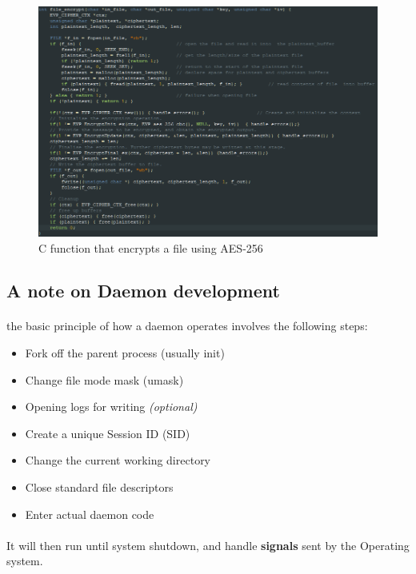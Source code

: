 \documentclass{article}
\begin{document}
        \begin{figure}[htbp]
            \centering\includegraphics[width=\textwidth]{encrypt_function_screenshot_1.png}
            \caption{C function that encrypts a file using AES-256}
            \label{fig:my_label}
        \end{figure}
    \newpage
    \subsection{A note on Daemon development}
        \paragraph{}the basic principle of how a daemon operates involves the following steps:
        \begin{itemize}
            \item Fork off the parent process (usually init)
            \item Change file mode mask (umask)
            \item Opening logs for writing \textit{(optional)}
            \item Create a unique Session ID (SID)
            \item Change the current working directory
            \item Close standard file descriptors
            \item Enter actual daemon code
        \end{itemize}
        \paragraph{}It will then run until system shutdown, and handle \textbf{signals} sent by the Operating system.
\end{document}

